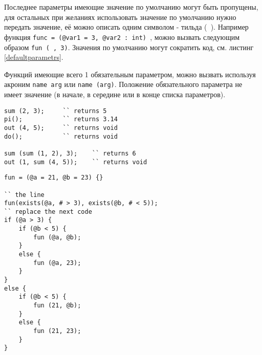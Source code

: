 Последнее параметры имеющие значение по умолчанию могут быть пропущены, для остальных при желаниях использовать значение по умолчанию нужно передать \void{} значение, её можно описать одним символом - тильда (\texttt{~}). Например функция \texttt{func = (@var1 = 3, @var2 : int) {}}, можно вызвать следующим образом \texttt{fun (~, 3)}. Значения по умолчанию могут сократить код, см. листинг \ref{defaultparametrs}.

Функций имеющие всего 1 обязательным параметром, можно вызвать используя акроним \texttt{name arg} или \texttt{name (arg)}. Положение обязательного параметра не имеет значение (в начале, в середине или в конце списка параметров).

\begin{sourcecode}
\label{callfunc}
\begin{verbatim}
sum (2, 3); 	`` returns 5
pi();			`` returns 3.14
out (4, 5); 	`` returns void
do();			`` returns void

sum (sum (1, 2), 3);	`` returns 6
out (1, sum (4, 5));	`` returns void
\end{verbatim}
\end{sourcecode}

\begin{sourcecode}
\label{defaultparametrs}
\begin{verbatim}
fun = (@a = 21, @b = 23) {}

`` the line 
fun(exists(@a, # > 3), exists(@b, # < 5));
`` replace the next code
if (@a > 3) {
	if (@b < 5) {
		fun (@a, @b);
	}
	else {
		fun (@a, 23);
	}
}
else {
	if (@b < 5) {
		fun (21, @b);
	}
	else {
		fun (21, 23);
	}
}
\end{verbatim}
\end{sourcecode}

